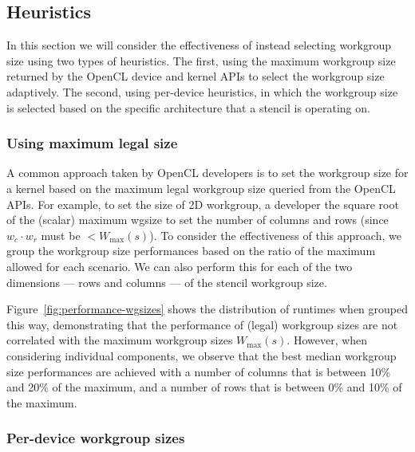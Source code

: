 \subsection{Heuristics}\label{subsec:heuristics}

In this section we will consider the effectiveness of instead
selecting workgroup size using two types of heuristics. The first,
using the maximum workgroup size returned by the OpenCL device and
kernel APIs to select the workgroup size adaptively. The second, using
per-device heuristics, in which the workgroup size is selected based
on the specific architecture that a stencil is operating on.

\subsubsection{Using maximum legal size}

A common approach taken by OpenCL developers is to set the workgroup
size for a kernel based on the maximum legal workgroup size queried
from the OpenCL APIs. For example, to set the size of 2D workgroup, a
developer the square root of the (scalar) maximum wgsize to set the
number of columns and rows (since $w_c \cdot w_r$ must be
$< W_{\max}(s)$). To consider the effectiveness of this approach, we
group the workgroup size performances based on the ratio of the
maximum allowed for each scenario. We can also perform this for each
of the two dimensions --- rows and columns --- of the stencil
workgroup size.

Figure~\ref{fig:performance-wgsizes} shows the distribution of
runtimes when grouped this way, demonstrating that the performance of
(legal) workgroup sizes are not correlated with the maximum workgroup
sizes $W_{\max}(s)$. However, when considering individual components,
we observe that the best median workgroup size performances are
achieved with a number of columns that is between 10\% and 20\% of the
maximum, and a number of rows that is between 0\% and 10\% of the
maximum.

\subsubsection{Per-device workgroup sizes}

\begin{table}
\scriptsize
\centering
{}

\caption[Performance of tuning with a per-device heuristic]{%
  Selecting workgroup size using a per-device heuristic. The mode
  optimal workgroup size for each device type $\bar{w}$ is evaluated
  based on legality, and relative performance to the oracle (minimum
  and average) when legal.%
}
\label{tab:heuristic-dev}
\end{table}

